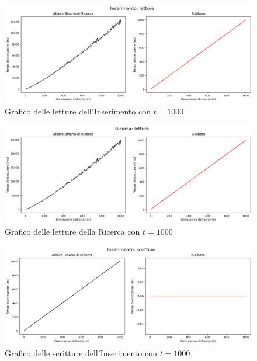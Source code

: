 \begin{figure}[H]
    \centering
    \includegraphics[width=\textwidth]{side-graphs/insert-r-t1000.png}
    \caption{Grafico delle letture dell'Inserimento con $t=1000$}
    \label{fig:sidegraphinsertread1000}
\end{figure}
    
\begin{figure}[H]
    \centering
    \includegraphics[width=\textwidth]{side-graphs/search-r-t1000.png}
    \caption{Grafico delle letture della Ricerca con $t=1000$}
    \label{fig:sidegraphsearchread1000}
\end{figure}

\begin{figure}[H]
    \centering
    \includegraphics[width=\textwidth]{side-graphs/insert-w-t1000.png}
    \caption{Grafico delle scritture dell'Inserimento con $t=1000$}
    \label{fig:sidegraphinsertwrite1000}
\end{figure}
    
